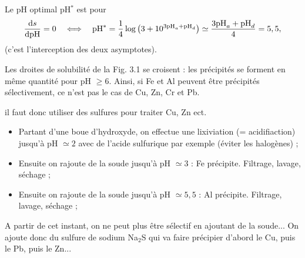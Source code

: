 \begin{solution}
\begin{questions}
    \question Le pH optimal pH$^\ast$ est pour
    $$\dv{s}{\text{pH}} = 0 \quad\Longleftrightarrow\quad
    \text{pH}^\ast = \dfrac{1}{4}\log\qty(3 + 10^{3\text{pH}_a + \text{pH}_d}) \simeq \dfrac{3\text{pH}_a + \text{pH}_d}{4} = 5,5,$$
    (c'est l'interception des deux asymptotes).
    
    \question Les droites de solubilité de la Fig. 3.1 se croisent : les précipités se forment en même quantité pour pH $\geqslant 6$. Ainsi, si Fe et Al peuvent être précipités sélectivement, ce n'est pas le cas de Cu, Zn, Cr et Pb.
    
      il faut donc utiliser des sulfures pour traiter Cu, Zn ect.
    
    \begin{itemize}
        \item Partant d'une boue d'hydroxyde, on effectue une lixiviation (= acidifiaction) jusqu'à pH $\simeq 2$ avec de l'acide sulfurique par exemple (éviter les halogènes) ;
        \item Ensuite on rajoute de la soude jusqu'à pH $\simeq 3$ : Fe précipite. Filtrage, lavage, séchage ;
        \item Ensuite on rajoute de la soude jusqu'à pH $\simeq 5,5$ : Al précipite. Filtrage, lavage, séchage ;
    \end{itemize}
    A partir de cet instant, on ne peut plus être sélectif en ajoutant de la soude... On ajoute donc du sulfure de sodium Na$_2$S qui va faire précipier d'abord le Cu, puis le Pb, puis le Zn...
    
\end{questions}
\end{solution}